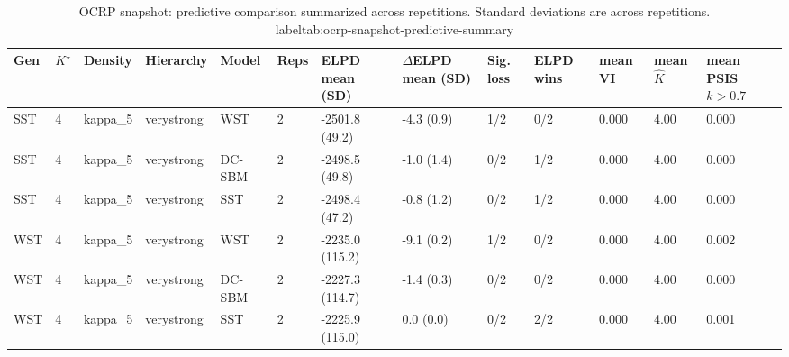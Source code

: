 \begin{table}[!h]
\centering
\caption{OCRP snapshot: predictive comparison summarized across repetitions. Standard deviations are across repetitions.\\label{tab:ocrp-snapshot-predictive-summary}}
\centering
\begin{tabular}[t]{lllllllllllll}
\toprule
Gen & $K^\star$ & Density & Hierarchy & Model & Reps & ELPD mean (SD) & $\Delta$ELPD mean (SD) & Sig. loss & ELPD wins & mean VI & mean $\hat K$ & mean PSIS $k>0.7$\\
\midrule
SST & 4 & kappa_5 & verystrong & WST & 2 & -2501.8 (49.2) & -4.3 (0.9) & 1/2 & 0/2 & 0.000 & 4.00 & 0.000\\
SST & 4 & kappa_5 & verystrong & DC-SBM & 2 & -2498.5 (49.8) & -1.0 (1.4) & 0/2 & 1/2 & 0.000 & 4.00 & 0.000\\
SST & 4 & kappa_5 & verystrong & SST & 2 & -2498.4 (47.2) & -0.8 (1.2) & 0/2 & 1/2 & 0.000 & 4.00 & 0.000\\
WST & 4 & kappa_5 & verystrong & WST & 2 & -2235.0 (115.2) & -9.1 (0.2) & 1/2 & 0/2 & 0.000 & 4.00 & 0.002\\
WST & 4 & kappa_5 & verystrong & DC-SBM & 2 & -2227.3 (114.7) & -1.4 (0.3) & 0/2 & 0/2 & 0.000 & 4.00 & 0.000\\
WST & 4 & kappa_5 & verystrong & SST & 2 & -2225.9 (115.0) & 0.0 (0.0) & 0/2 & 2/2 & 0.000 & 4.00 & 0.001\\
\bottomrule
\end{tabular}
\end{table}
